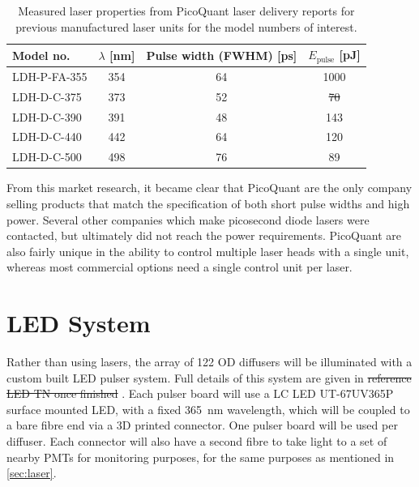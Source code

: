 \documentclass[a4paper,11pt]{article}
\providecommand{\DIFaddtex}[1]{{\protect\color{blue}\uwave{#1}}} %
\providecommand{\DIFdeltex}[1]{{\protect\color{red}\sout{#1}}}                      %
\providecommand{\DIFaddbegin}{} %
\providecommand{\DIFaddend}{} %
\providecommand{\DIFdelbegin}{} %
\providecommand{\DIFdelend}{} %
\providecommand{\DIFaddFL}[1]{\DIFadd{#1}} %
\providecommand{\DIFdelFL}[1]{\DIFdel{#1}} %
\providecommand{\DIFaddbeginFL}{} %
\providecommand{\DIFaddendFL}{} %
\providecommand{\DIFdelbeginFL}{} %
\providecommand{\DIFdelendFL}{} %
\providecommand{\DIFadd}[1]{\texorpdfstring{\DIFaddtex{#1}}{#1}} %
\providecommand{\DIFdel}[1]{\texorpdfstring{\DIFdeltex{#1}}{}} %
\newcommand{\DIFscaledelfig}{0.5}
\newlength{\DIFdelgraphicswidth} %
\newlength{\DIFdelgraphicsheight} %
\newcommand{\DIFaddincludegraphics}[2][]{{\color{blue}\fbox{\DIFOincludegraphics[#1]{#2}}}} %
\newcommand{\DIFdelincludegraphics}[2][]{%
\sbox{\DIFdelgraphicsbox}{\DIFOincludegraphics[#1]{#2}}%
\settoboxwidth{\DIFdelgraphicswidth}{\DIFdelgraphicsbox} %
\settoboxtotalheight{\DIFdelgraphicsheight}{\DIFdelgraphicsbox} %
\scalebox{\DIFscaledelfig}{%
\parbox[b]{\DIFdelgraphicswidth}{\usebox{\DIFdelgraphicsbox}\\[-\baselineskip] \rule{\DIFdelgraphicswidth}{0em}}\llap{\resizebox{\DIFdelgraphicswidth}{\DIFdelgraphicsheight}{%
\setlength{\unitlength}{\DIFdelgraphicswidth}%
\begin{picture}(1,1)%
\thicklines\linethickness{2pt} %
{\color[rgb]{1,0,0}\put(0,0){\framebox(1,1){}}}%
{\color[rgb]{1,0,0}\put(0,0){\line( 1,1){1}}}%
{\color[rgb]{1,0,0}\put(0,1){\line(1,-1){1}}}%
\end{picture}%
}\hspace*{3pt}}} %
} %
\DeclareRobustCommand{\DIFaddbegin}{\DIFOaddbegin \let\includegraphics\DIFaddincludegraphics} %
\DeclareRobustCommand{\DIFaddend}{\DIFOaddend \let\includegraphics\DIFOincludegraphics} %
\DeclareRobustCommand{\DIFdelbegin}{\DIFOdelbegin \let\includegraphics\DIFdelincludegraphics} %
\DeclareRobustCommand{\DIFdelend}{\DIFOaddend \let\includegraphics\DIFOincludegraphics} %
\DeclareRobustCommand{\DIFaddbeginFL}{\DIFOaddbeginFL \let\includegraphics\DIFaddincludegraphics} %
\DeclareRobustCommand{\DIFaddendFL}{\DIFOaddendFL \let\includegraphics\DIFOincludegraphics} %
\DeclareRobustCommand{\DIFdelbeginFL}{\DIFOdelbeginFL \let\includegraphics\DIFdelincludegraphics} %
\DeclareRobustCommand{\DIFdelendFL}{\DIFOaddendFL \let\includegraphics\DIFOincludegraphics} %
\begin{document}
\begin{table}
\centering
\begin{tabular}{lccc}
\toprule
Model no.	   & $\lambda$ [nm]  & Pulse width (FWHM) [ps] &  $E_\text{pulse}$ [pJ]	\\ \midrule
LDH-P-FA-355	&	354			&   64						&	1000			\\
LDH-D-C-375		&	373			&	52						&	\DIFdelbeginFL %
\DIFdelFL{70	}\DIFdelendFL \DIFaddbeginFL \phantom{0}\DIFaddFL{143	}\DIFaddendFL \\
LDH-D-C-390		&	391			&	48						&	\phantom{0}143	\\
LDH-D-C-440		&	442			&	64						&	\phantom{0}120	\\
LDH-D-C-500		&	498			&	76						&	\phantom{00}89	\\
 \bottomrule
\end{tabular}
\caption{Measured laser properties from PicoQuant laser delivery reports for previous manufactured laser units  for the model numbers of interest.}\label{tab:laserPower}
\end{table}

From this market research, it became clear that PicoQuant are the only company selling products that match the specification of both short pulse widths and high power. Several other companies which make picosecond diode lasers were contacted, but ultimately did not reach the power requirements. PicoQuant are also fairly unique in the ability to control multiple laser heads with a single unit, whereas most commercial options need a single control unit per laser.

\section{LED System}\label{sec:LED}
Rather than using lasers, the array of 122 OD diffusers will be illuminated with a custom built LED pulser system. Full details of this system are given in \DIFdelbegin %
\DIFdel{reference LED TN once finished}%
\DIFdelend \DIFaddbegin \DIFadd{\mbox{%
\cite{bib:tn0111}}\hskip0pt%
}\DIFaddend . Each pulser board will use a LC LED UT-67UV365P \cite{bib:LCLED} surface mounted LED, with a fixed 365~nm wavelength, which will be coupled to a bare fibre end via a 3D printed connector. One pulser board will be used per diffuser. Each connector will also have a second fibre to take light to a set of nearby PMTs for monitoring purposes, for the same purposes as mentioned in \cref{sec:laser}.
\end{document}
